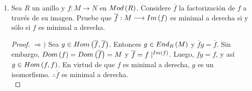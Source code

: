 \documentclass{article}
\begin{document}
\begin{enumerate}[label=\textbf{Ej \arabic*.}]
\begin{proof}
			 Supongamos que $S$, con $\circ$ como producto, es una $R$-álgebra por medio del morfismo $\varphi$. Entonces necesariamente $\exists$  $+$ operación en $S$ tal que $S:=\lrprth{End_{\mathcal{C}}\lrbrack{*},+,\circ}$ es un anillo y, por el Ej. 3, $\varphi$ induce una acción compatible del anillo conmutativo $R$ en $S$, $\bullet_\varphi$. Notemos que las propiedades de las acciones compatibles garantizan que por medio de $\bullet_\varphi$ $S\in Mod\lrprth{R}$ y que, si $r\in R$ y $f,g,h\in S$
			\begin{align*}
				\lrprth{r\bullet_\varphi f+g}\circ h&=\lrprth{r\bullet_\varphi f}\circ h+g\circ h=r\bullet_\varphi\lrprth{f\circ h}+ g\circ h,\\
				f\circ\lrprth{r\bullet_\varphi g+ h}&=f\circ\lrprth{r\bullet_\varphi g}+ f\circ h=r\bullet_\varphi\lrprth{f\circ h}+ f\circ h.
			\end{align*}
			Con lo cual se satisfacen las condiciones i) y ii) enunciadas en la demostración de la necesidad, y por lo tanto $\mathcal{C}$ es una $R$-categoría.
			\begin{obs}
				Notemos que tanto en la necesidad como en la suficiencia de lo previamente demostrado $S$ posee una estructura de anillo, por medio de la cual puede obtener una estructura natural de $S$-módulo. Más aún, por el Ej. 5, la estructura que posee $S$ cómo $R$-módulo  coincide con aquella que se puede obtener aplicando un cambio de anillos $\gamma:R\to S$ a $\ringmod{S}{S}{l}$  ($\gamma=\varphi_\bullet$ en la necesidad y $\gamma=\varphi$ en la suficiencia).
			\end{obs}
			 Como $R$ es artiniano, por el Teorema 2.7.15$a)$ se tiene que
			\begin{align*}
				S\in f.l.\lrprth{R}\iff S&\in mod\lrprth{R}.
			\end{align*}
			De lo anterior, el inciso $a)$ y la Observación, se tiene lo deseado.\\			
		\end{proof}
		\item Sea $R$ un anillo y $f:M \longrightarrow N$ en $Mod\left(R\right)$. Considere $\overline{f}$ la factorización de $f$ a través de su imagen. Pruebe que $\overline{f}:M \longrightarrow Im\left(f\right)$ es minimal a derecha si y sólo si $f$ es minimal a derecha.
		\begin{proof}
			$\boxed{\Rightarrow )}$ Sea $g \in Hom\left(\overline{f},\overline{f}\right)$. Entonces $g \in End_{R}\left(M\right)$ y $\overline{f}g=\overline{f}$. Sin embargo, $Dom\left(f\right)=Dom\left(\overline{f}\right)=M$ y $\overline{f}=f\mid^{Im\left(f\right)}$. Luego, $fg=f$, y así $g \in Hom\left(f,f\right)$. En virtud de que $f$ es minimal a derecha, $g$ es un isomorfismo. $\therefore\overline{f}$ es minimal a derecha.\\
		

\end{proof}
\end{enumerate}
\end{document}
